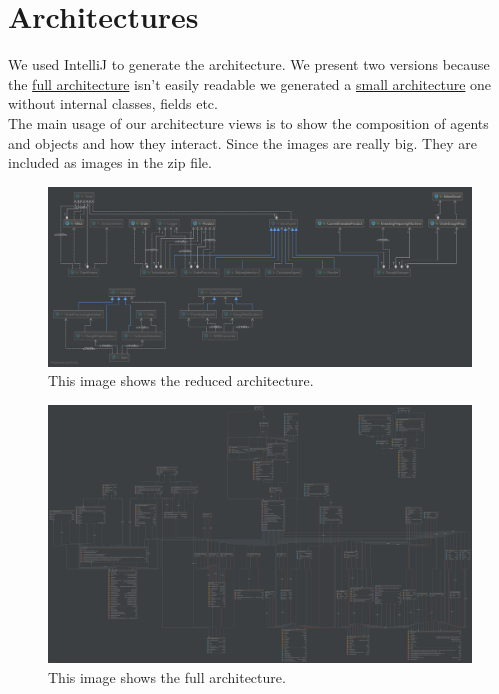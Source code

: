 \documentclass[10pt,a4paper]{article}
\begin{document}
	\section{Architectures}
	We used IntelliJ to generate the architecture. We present two versions because the \hyperref[fig:arch_full]{\color{blue}full architecture} isn't easily readable we generated a \hyperref[fig:arch_small]{\color{blue}small architecture} one without internal classes, fields etc.
	\\
	The main usage of our architecture views is to show the composition of agents and objects and how they interact. Since the images are really big. They are included as images in the zip file.
	\newpage
	\recalctypearea
	\begin{figure}[hbt!]
		\hspace*{-6cm}
		\centering
		\includegraphics[width=0.9\paperwidth]{Architecture_small.png}
		\caption{This image shows the reduced architecture.}
		\label{fig:arch_small}
	\end{figure}
	\newpage
	\begin{figure}[hbt!]
		\hspace*{-6cm}
		\centering
		\includegraphics[width=0.9\paperwidth]{Architecture_full.png}
		\caption{This image shows the full architecture.}
		\label{fig:arch_full}
		
	\end{figure}
\end{document}
